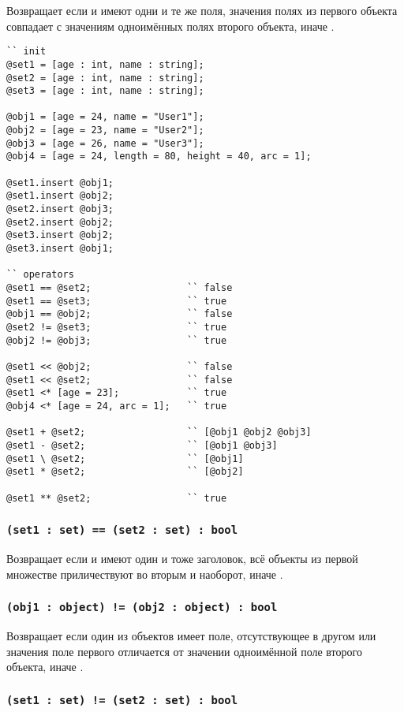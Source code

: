 Возвращает \true{} если  и  имеют одни и те же поля, значения полях из первого объекта совпадает с значениям одноимённых полях второго объекта, иначе \false{}.

\begin{lstlisting}[caption=Примеры использования операторов над данными типа object и set, label=setobjopex]
`` init
@set1 = [age : int, name : string];
@set2 = [age : int, name : string];
@set3 = [age : int, name : string];

@obj1 = [age = 24, name = "User1"];
@obj2 = [age = 23, name = "User2"];
@obj3 = [age = 26, name = "User3"];
@obj4 = [age = 24, length = 80, height = 40, arc = 1];

@set1.insert @obj1;
@set1.insert @obj2;
@set2.insert @obj3;
@set2.insert @obj2;
@set3.insert @obj2;
@set3.insert @obj1;

`` operators
@set1 == @set2;					`` false
@set1 == @set3;					`` true
@obj1 == @obj2;					`` false
@set2 != @set3;					`` true
@obj2 != @obj3;					`` true

@set1 << @obj2;					`` false
@set1 << @set2;					`` false
@set1 <* [age = 23];			`` true
@obj4 <* [age = 24, arc = 1];	`` true

@set1 + @set2;					`` [@obj1 @obj2 @obj3]
@set1 - @set2;					`` [@obj1 @obj3]
@set1 \ @set2;					`` [@obj1]
@set1 * @set2;					`` [@obj2]

@set1 ** @set2;					`` true
\end{lstlisting}

\subsubsection{\lstinline|(set1 : set) == (set2 : set) : bool|}

Возвращает \true{} если  и  имеют один и тоже заголовок, всё объекты из первой множестве приличествуют во вторым и наоборот, иначе \false{}.

\subsubsection{\lstinline|(obj1 : object) != (obj2 : object) : bool|}

Возвращает \true{} если один из объектов имеет поле, отсутствующее в другом или значения поле первого отличается от значении одноимённой поле второго объекта, иначе \false{}.

\subsubsection{\lstinline|(set1 : set) != (set2 : set) : bool|}

